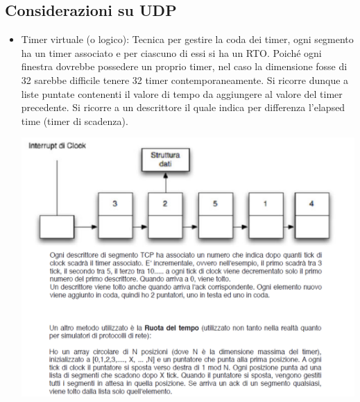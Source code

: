 \documentclass[11pt, oneside]{article}   	%
\begin{document}
\subsection*{Considerazioni su UDP}
\begin{itemize}
\item Timer virtuale (o logico):
Tecnica per gestire la coda dei timer, ogni segmento ha un timer associato e per ciascuno di essi si ha un RTO. Poiché ogni finestra dovrebbe possedere un proprio timer, nel caso la dimensione fosse di 32 sarebbe difficile tenere 32 timer contemporaneamente. Si ricorre dunque a liste puntate contenenti il valore di tempo da aggiungere al valore del timer precedente. Si ricorre a un descrittore il quale indica per differenza l’elapsed time (timer di scadenza).
\begin{center}
\includegraphics[scale=0.5]{fjia}
\end{center}
\end{itemize}
\end{document}
